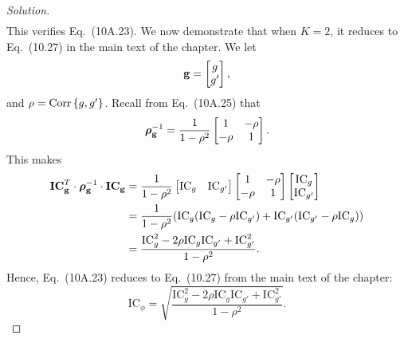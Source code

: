 \begin{proof}[Solution]
\begin{align*}
\end{align*}
This verifies Eq.\ (10A.23). We now demonstrate that when $K = 2$, it reduces to Eq.\ (10.27) in the main text of the chapter. We let \[\mathbf{g} = \begin{bmatrix}
g \\
g'
\end{bmatrix},
\] and $\rho = \mathrm{Corr}\left\lbrace g, g'\right\rbrace$. Recall from Eq.\ (10A.25) that \[
\bm{\rho}_{\mathbf{g}}^{-1} = \frac{1}{1 - \rho^{2}}
\begin{bmatrix}
1 & -\rho \\
-\rho & 1
\end{bmatrix}.
\] This makes
\begin{align*}
\bm{\mathrm{IC}}_{\mathbf{g}}^{T} \cdot \bm{\rho}_{\mathbf{g}}^{-1} \cdot \bm{\mathrm{IC}}_{\mathbf{g}} &= \frac{1}{1 - \rho^{2}}
\begin{bmatrix}
\mathrm{IC}_{g} & \mathrm{IC}_{g'}
\end{bmatrix}
\begin{bmatrix}
1 & -\rho \\
-\rho & 1
\end{bmatrix}
\begin{bmatrix}
\mathrm{IC}_{g}\\
\mathrm{IC}_{g'}
\end{bmatrix}
\\
&= \frac{1}{1 - \rho^{2}} (\mathrm{IC}_{g}(\mathrm{IC}_{g} - \rho\mathrm{IC}_{g'}) + \mathrm{IC}_{g'}(\mathrm{IC}_{g'} - \rho\mathrm{IC}_{g})) \\
&= \frac{\mathrm{IC}_{g}^{2} - 2 \rho \mathrm{IC}_{g}\mathrm{IC}_{g'} + \mathrm{IC}_{g'}^{2}}{1 - \rho^{2}}.
\end{align*}
Hence, Eq.\ (10A.23) reduces to Eq.\ (10.27) from the main text of the chapter:
\[\mathrm{IC}_{\phi} = \sqrt{\frac{\mathrm{IC}_{g}^{2} - 2 \rho \mathrm{IC}_{g}\mathrm{IC}_{g'} + \mathrm{IC}_{g'}^{2}}{1 - \rho^{2}}}.\]
\end{proof}

